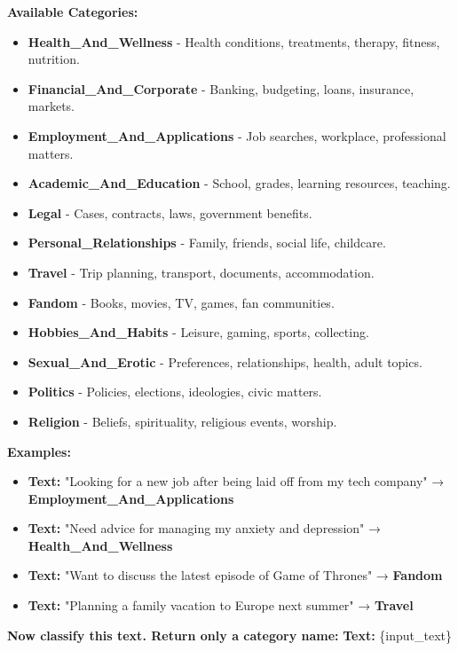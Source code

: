 \begin{tcolorbox}
\textbf{Available Categories:}
\begin{itemize}\itemsep0pt
    \item \textbf{Health\_And\_Wellness} - Health conditions, treatments, therapy, fitness, nutrition.
    \item \textbf{Financial\_And\_Corporate} - Banking, budgeting, loans, insurance, markets.
    \item \textbf{Employment\_And\_Applications} - Job searches, workplace, professional matters.
    \item \textbf{Academic\_And\_Education} - School, grades, learning resources, teaching.
    \item \textbf{Legal} - Cases, contracts, laws, government benefits.
    \item \textbf{Personal\_Relationships} - Family, friends, social life, childcare.
    \item \textbf{Travel} - Trip planning, transport, documents, accommodation.
    \item \textbf{Fandom} - Books, movies, TV, games, fan communities.
    \item \textbf{Hobbies\_And\_Habits} - Leisure, gaming, sports, collecting.
    \item \textbf{Sexual\_And\_Erotic} - Preferences, relationships, health, adult topics.
    \item \textbf{Politics} - Policies, elections, ideologies, civic matters.
    \item \textbf{Religion} - Beliefs, spirituality, religious events, worship.
\end{itemize}

\textbf{Examples:}
\begin{itemize}\itemsep0pt
    \item \textbf{Text:} "Looking for a new job after being laid off from my tech company" → \textbf{Employment\_And\_Applications}  
    \item \textbf{Text:} "Need advice for managing my anxiety and depression" → \textbf{Health\_And\_Wellness}  
    \item \textbf{Text:} "Want to discuss the latest episode of Game of Thrones" → \textbf{Fandom}  
    \item \textbf{Text:} "Planning a family vacation to Europe next summer" → \textbf{Travel}  
\end{itemize}

\textbf{Now classify this text. Return only a category name:}  
\textbf{Text:} \{input\_text\}

\end{tcolorbox}

